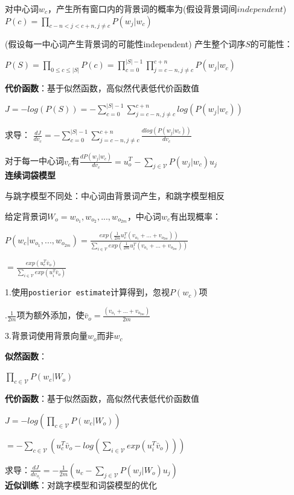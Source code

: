 \documentclass[UTF8]{ctexart}
\begin{document}
  \quad 对中心词$w_c$，产生所有窗口内的背景词的概率为(假设背景词间$independent$)$P(c) = \prod_{c-n<j<c+n, j \neq c} P(w_j | w_c)$

  \quad (假设每一中心词产生背景词的可能性independent) 产生整个词序$S$的可能性：
  
  \quad \quad $P(S) = \prod_{0\leq c \leq |S|} P(c) = \prod_{c = 0}^{|S|-1} \prod_{j = c-n, j \neq c}^{c+n} P(w_j | w_c)$
  
  \textbf{代价函数}：基于似然函数，高似然代表低代价函数值

  \quad $J = -log(P(S)) = -\sum_{c = 0}^{|S|-1} \sum_{j = c-n, j \neq c}^{c+n} log(P(w_j | w_c))$
  
  \quad 求导： $\frac{d J}{d v_c} = -\sum_{c = 0}^{|S|-1} \sum_{j = c-n, j \neq c}^{c+n} \frac{d log(P(w_j | w_c))}{d v_c}$

  \quad \quad 对于每一中心词$v_c$有$\frac{d P(w_j | w_c)}{d v_c} = u_o^T - \sum_{j\in\mathcal{V}}P(w_j | w_c)u_j$\\
\textbf{连续词袋模型}

  与跳字模型不同处：中心词由背景词产生，和跳字模型相反

  给定背景词$W_o = w_{o_1}, w_{o_2}, ..., w_{o_{2m}}$，中心词$w_c$有出现概率：
  
  \quad $P(w_c | w_{o_1}, ..., w_{o_{2m}}) = \frac{exp(\frac{1}{2m}u_c^T(v_{o_1} + ... + v_{o_{2m}}))}{\sum_{i\in \mathcal{V} } exp(\frac{1}{2m}u_i^T(v_{o_1} + ... + v_{o_{2m}}))}$

  \quad \quad $= \frac{exp(u_c^T\bar{v}_o)}{\sum_{i\in \mathcal{V} } exp(u_i^T\bar{v}_o )}$

  \quad 1.使用\texttt{postierior estimate}计算得到，忽视$P(w_c)$项

  .$\frac{1}{2m}$项为额外添加，使$\bar{v}_o = \frac{(v_{o_1} + ... + v_{o_{2m}})}{2m}$

  \quad 3.背景词使用背景向量$w_o$而非$w_c$
  
  \textbf{似然函数}：

  \quad $\prod_{c \in \mathcal{V} } P(w_c | W_o)$

  \textbf{代价函数}：基于似然函数，高似然代表低代价函数值

  \quad $J = -log(\prod_{c \in \mathcal{V} } P(w_c | W_o))$

  \quad \quad $= -\sum_{c \in \mathcal{V} } (u_c^T\bar{v}_o - log(\sum_{i\in \mathcal{V} } exp(u_i^T\bar{v}_o )))$

  \quad 求导：$\frac{d J}{d v_{o_i}} = -\frac{1}{2m}(u_c - \sum_{j \in \mathcal{V} }P(w_j | W_o)u_j)$\\
\textbf{近似训练}：对跳字模型和词袋模型的优化
\end{document}
